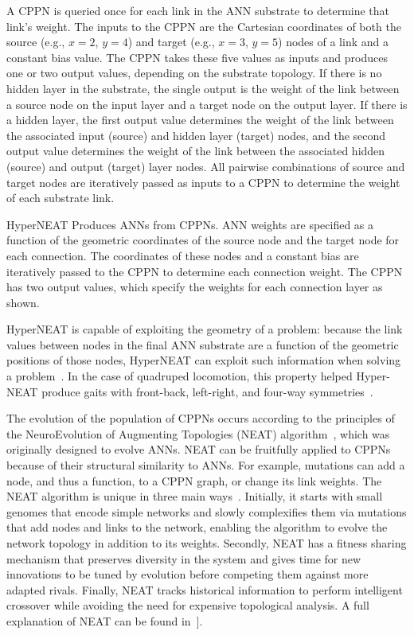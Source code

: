 \begin{itemize}
A CPPN is queried once for each link in the ANN substrate to determine
that link's weight. The inputs to the CPPN are the Cartesian
coordinates of both the source (e.g., $x = 2$, $y = 4$) and target
(e.g., $x = 3$, $y = 5$) nodes of a link and a constant bias
value. The CPPN takes these five values as inputs and produces one or
two output values, depending on the substrate topology. If there is no
hidden layer in the substrate, the single output is the weight of the
link between a source node on the input layer and a target node on the
output layer. If there is a hidden layer, the first output value
determines the weight of the link between the associated input
(source) and hidden layer (target) nodes, and the second output value
determines the weight of the link between the associated hidden
(source) and output (target) layer nodes. All pairwise combinations of
source and target nodes are iteratively passed as inputs to a CPPN to
determine the weight of each substrate link.

 HyperNEAT Produces ANNs from CPPNs. ANN
weights are specified as a function of the geometric coordinates of
the source node and the target node for each connection. The
coordinates of these nodes and a constant bias are iteratively passed
to the CPPN to determine each connection weight. The CPPN has two
output values, which specify the weights for each connection layer as
shown.

HyperNEAT is capable of exploiting the geometry of a problem: because
the link values between nodes in the final ANN substrate are a
function of the geometric positions of those nodes, HyperNEAT can
exploit such information when solving a
problem~\cite{stanley2009hypercube, clune2009sensitivity,
  clune2011performance}. In the case of quadruped locomotion, this
property helped Hyper-NEAT produce gaits with front-back, left-right,
and four-way symmetries~\cite{clune2009evolving,
  clune2011performance}.
  
The evolution of the population of CPPNs occurs according to the
principles of the NeuroEvolution of Augmenting Topologies (NEAT)
algorithm~\cite{stanley2002evolving}, which was originally designed to
evolve ANNs. NEAT can be fruitfully applied to CPPNs because of their
structural similarity to ANNs. For example, mutations can add a node,
and thus a function, to a CPPN graph, or change its link weights. The
NEAT algorithm is unique in three main
ways~\cite{stanley2002evolving}. Initially, it starts with small
genomes that encode simple networks and slowly complexifies them via
mutations that add nodes and links to the network, enabling the
algorithm to evolve the network topology in addition to its
weights. Secondly, NEAT has a fitness sharing mechanism that preserves
diversity in the system and gives time for new innovations to be tuned
by evolution before competing them against more adapted
rivals. Finally, NEAT tracks historical information to perform
intelligent crossover while avoiding the need for expensive
topological analysis. A full explanation of NEAT can be found
in~\cite{stanley2002evolving}].
  

\end{itemize}
